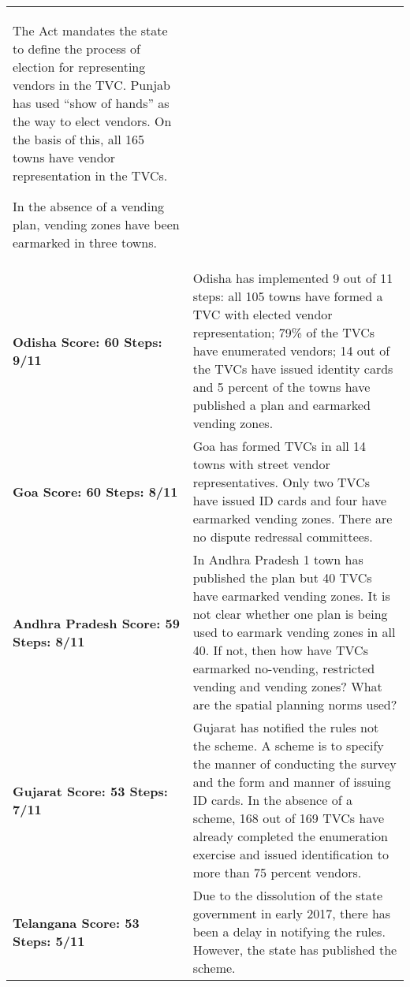 \documentclass[a4paper, 12pt, twoside]{article}
\begin{document}
\begin{longtable}[l]{>{\raggedright}p{4cm}>{\raggedright\arraybackslash}p{10cm}}
The Act mandates the state to define the process of election for representing vendors in the TVC. Punjab has used “show of hands” as the way to elect vendors. On the basis of  this, all 165 towns have vendor representation in the TVCs.


In the absence of a vending plan, vending zones have been earmarked in three towns.
\\
\cellcolor{SVACgreen3}\bf{Odisha}
\newline
\bf{Score: 60}
\newline
\bf{Steps: 9/11}
&
\cellcolor{SVACgreen2}Odisha has implemented 9 out of 11 steps: all 105 towns have formed a TVC with elected vendor representation; 79\% of the TVCs have enumerated vendors; 14 out of the TVCs have issued identity cards and 5 percent of the towns have published a plan and earmarked vending zones.
\\
\cellcolor{SVACgreen3}\bf{Goa}
\newline
\bf{Score: 60}
\newline
\bf{Steps: 8/11}
&
\cellcolor{SVACgreen2}Goa has formed TVCs in all 14 towns with street vendor representatives. Only two TVCs have issued ID cards and four have earmarked vending zones. There are no dispute redressal committees. 
\\
\cellcolor{SVACgreen3}\bf{Andhra Pradesh}
\newline
\bf{Score: 59}
\newline
\bf{Steps: 8/11}
&
\cellcolor{SVACgreen2}In Andhra Pradesh 1 town has published the plan but 40 TVCs have earmarked vending zones. It is not clear whether one plan is being used to earmark vending zones in all 40. If not, then how have TVCs earmarked no-vending, restricted vending and vending zones? What are the spatial planning norms used?
\\
\cellcolor{SVACgreen3}\bf{Gujarat}
\newline
\bf{Score: 53}
\newline
\bf{Steps: 7/11}
&
\cellcolor{SVACgreen2}Gujarat has notified the rules not the scheme. A scheme is to specify the manner of conducting the survey and the form and manner of issuing ID cards. In the absence of a scheme, 168 out of 169 TVCs have already completed the enumeration exercise and issued identification to more than 75 percent vendors.
\\
\cellcolor{SVACgreen3}\bf{Telangana}
\newline
\bf{Score: 53}
\newline
\bf{Steps: 5/11}
&
\cellcolor{SVACgreen2}Due to the dissolution of the state government in early 2017, there has been a delay in notifying the rules. However, the state has published the scheme.


\end{longtable}
\end{document}

